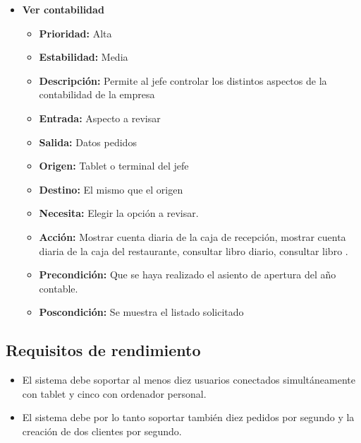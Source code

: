 \documentclass[spanish,a4paper,12pt]{report}		%
\begin{document}
\begin{itemize}
\begin{itemize}
		\end{itemize}%

		\item \textbf{Ver contabilidad} %

		\begin{itemize}

			\item \textbf{Prioridad: }Alta
			\item \textbf{Estabilidad: }Media
			\item \textbf{Descripción: }Permite al jefe controlar los distintos aspectos de la contabilidad de la empresa
			\item \textbf{Entrada: } Aspecto a revisar
			\item \textbf{Salida: } Datos pedidos
			\item \textbf{Origen: } Tablet o terminal del jefe
			\item \textbf{Destino: } El mismo que el origen
			\item \textbf{Necesita: } Elegir la opción a revisar.
			\item \textbf{Acción: }Mostrar cuenta diaria de la caja de recepción, mostrar cuenta diaria de la caja del restaurante, consultar libro diario, consultar libro .
			\item \textbf{Precondición: } Que se haya realizado el asiento de apertura del año contable.
			\item \textbf{Poscondición: } Se muestra el listado solicitado

		\end{itemize}%

\end{itemize}%

\subsection{Requisitos de rendimiento}
\begin{itemize}
	\item El sistema debe soportar al menos diez usuarios conectados simultáneamente con tablet y cinco con ordenador personal.
	\item El sistema debe por lo tanto soportar también diez pedidos por segundo y la creación de dos clientes por segundo. 
\end{itemize}
\end{document}
